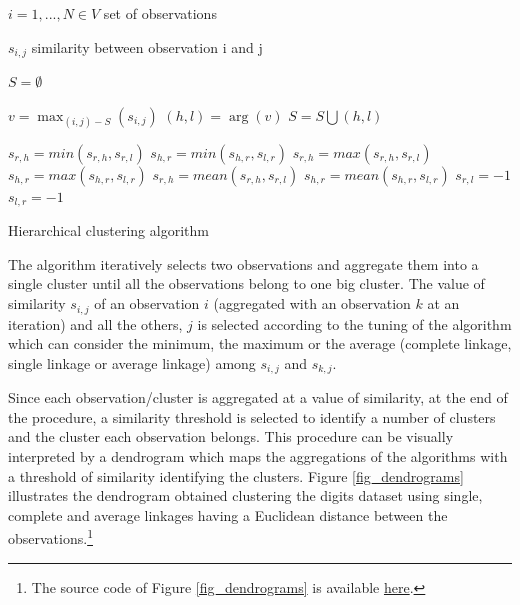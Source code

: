 \begin{algorithm}[H]
\DontPrintSemicolon
\SetAlgoLined
    
    $i=1,...,N \in V$ set of observations \;
    
    $s_{i,j}$ similarity between observation i and j \;
    
    $S= \emptyset $ \;
    {
    $v =\max_{(i,j)-S}{(s_{i,j})}$ \;
    $(h,l)=\arg(v)$\;
    $S= S \bigcup (h,l)$ \;
    {
     {
    $s_{r,h}=min(s_{r,h},s_{r,l})$\;
    $s_{h,r}=min(s_{h,r},s_{l,r})$\;
    }
     {
    $s_{r,h}=max(s_{r,h},s_{r,l})$\;
    $s_{h,r}=max(s_{h,r},s_{l,r})$\;
    }
     {
    $s_{r,h}=mean(s_{r,h},s_{r,l})$\;
    $s_{h,r}=mean(s_{h,r},s_{l,r})$\;
    }
    $s_{r,l}=-1$\;
    $s_{l,r}=-1$\;
    
    }
    }
\caption{Hierarchical clustering algorithm}
\label{algo_hierarchical}        
\end{algorithm}

The algorithm iteratively selects two observations and aggregate them into a single cluster until all the observations belong to one big cluster. The value of similarity $s_{i,j}$ of an observation $i$ (aggregated with an observation $k$ at an iteration) and all the others, $j$ is selected according to the tuning of the algorithm which can consider the minimum, the maximum or the average (complete linkage, single linkage or average linkage) among $s_{i,j}$ and $s_{k,j}$.\par

Since each observation/cluster is aggregated at a value of similarity, at the end of the procedure, a similarity threshold is selected to identify a number of clusters and the cluster each observation belongs. This procedure can be visually interpreted by a dendrogram which maps the aggregations of the algorithms with a threshold of similarity identifying the clusters. Figure \ref{fig_dendrograms} illustrates the dendrogram obtained clustering the digits dataset using single, complete and average linkages having a Euclidean distance between the observations.\footnote{The source code of Figure \ref{fig_dendrograms} is available \href{https://github.com/aletuf93/logproj/blob/master/examples/06.\%20Unsupervised\%20learning.ipynb}{here}.}

